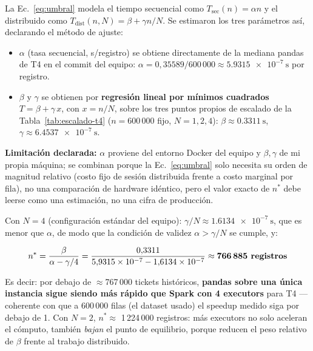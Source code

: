 \documentclass[11pt,a4paper]{article}
\begin{document}
La Ec.~\eqref{eq:umbral} modela el tiempo secuencial como \(T_{\text{sec}}(n)=\alpha n\) y el
distribuido como \(T_{\text{dist}}(n,N)=\beta+\gamma n/N\). Se estimaron los tres parámetros
así, declarando el método de ajuste:

\begin{itemize}
\item \(\alpha\) (tasa secuencial, s/registro) se obtiene directamente de la mediana pandas de
T4 en el commit del equipo: \(\alpha = 0{,}35589/600\,000 \approx \SI{5.9315e-7}{\second}\) por
registro.
\item \(\beta\) y \(\gamma\) se obtienen por \textbf{regresión lineal por mínimos cuadrados}
\(T = \beta + \gamma\,x\), con \(x=n/N\), sobre los tres puntos propios de escalado de la
Tabla~\ref{tab:escalado-t4} (\(n=600\,000\) fijo, \(N=1,2,4\)): \(\beta \approx \SI{0.3311}{\second}\),
\(\gamma \approx \SI{6.4537e-7}{\second}\).
\end{itemize}

\textbf{Limitación declarada:} \(\alpha\) proviene del entorno Docker del equipo y \(\beta,\gamma\)
de mi propia máquina; se combinan porque la Ec.~\eqref{eq:umbral} solo necesita su orden de
magnitud relativo (costo fijo de sesión distribuida frente a costo marginal por fila), no una
comparación de hardware idéntico, pero el valor exacto de \(n^{*}\) debe leerse como una
estimación, no una cifra de producción.

Con \(N=4\) (configuración estándar del equipo): \(\gamma/N \approx \SI{1.6134e-7}{\second}\),
que es menor que \(\alpha\), de modo que la condición de validez \(\alpha > \gamma/N\) se
cumple, y:

\[
n^{*} = \frac{\beta}{\alpha-\gamma/4} = \frac{0{,}3311}{5{,}9315\times10^{-7}-1{,}6134\times10^{-7}} \approx \textbf{766\,885 registros}
\]

Es decir: por debajo de \(\approx\)767\,000 tickets históricos, \textbf{pandas sobre una única
instancia sigue siendo más rápido que Spark con 4 executors} para T4 --- coherente con que a
600\,000 filas (el dataset usado) el speedup medido siga por debajo de 1. Con \(N=2\),
\(n^{*}\approx\) 1\,224\,000 registros: más executors no solo aceleran el cómputo, también
\emph{bajan} el punto de equilibrio, porque reducen el peso relativo de \(\beta\) frente al
trabajo distribuido.
\end{document}
